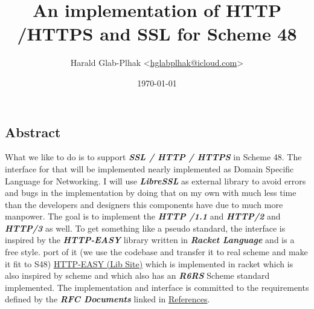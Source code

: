 \documentclass[10pt,a4paper,english]{article}
\title{An implementation of HTTP /HTTPS and SSL for Scheme 48 }
\author{Harald Glab-Plhak {\textless}\href{mailto:hglabplhak@icloud.com}{hglabplhak@icloud.com}{\textgreater}}
\date{\today{}}
\newcommand{\abbrhighcol}[1]{\textbf{\textit{#1}}}
\begin{document}



\maketitle
\tableofcontents

\begin{multicols}{2}
\section{Abstract}

\begin{flushleft}
What we like to do is to support \abbrhighcol{SSL / HTTP  / HTTPS} in Scheme 48. The interface for that will be implemented nearly implemented as Domain Specific Language for Networking. I will use  \abbrhighcol{LibreSSL} as external library to avoid errors and bugs in the implementation by doing that on my own with much less time than the developers and designers this components have due to much more manpower.  
The goal is to implement the \abbrhighcol{HTTP /1.1} and \abbrhighcol{HTTP/2} and \abbrhighcol{HTTP/3} as well. To get something  like a pseudo standard,  the interface is inspired by the \abbrhighcol{HTTP-EASY} library written in  \abbrhighcol{Racket Language} and is a free style. port of it (we use the codebase and transfer it to real scheme and make it fit to S48)
\href{https://pkgs.racket-lang.org/package/http-easy-lib}{HTTP-EASY (Lib Site)}  which is implemented in racket which is also inspired by scheme and which also has an \abbrhighcol{R6RS} Scheme standard implemented. 
The implementation and interface is committed to the requirements defined by the  \abbrhighcol{RFC Documents} linked in \hyperref[sec:references]{References}.
\end{flushleft}


\end{multicols}
\end{document}
